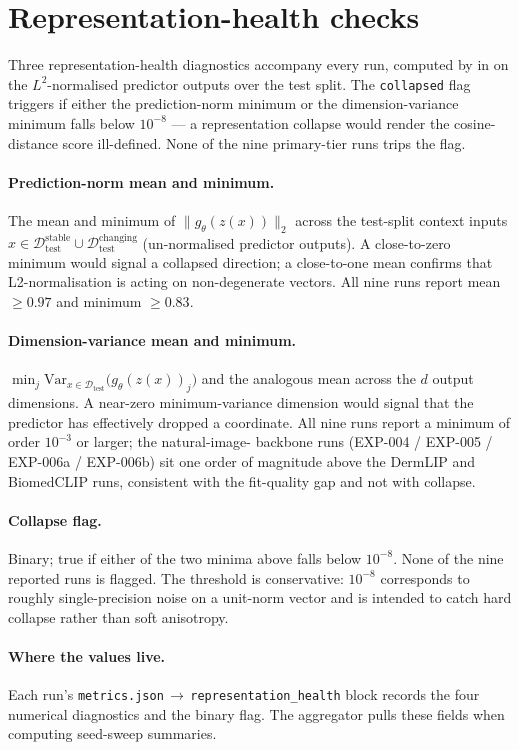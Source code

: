 \section{Representation-health checks}
\label{app:representation-health}

Three representation-health diagnostics accompany every run, computed
by  in  on the
$L^{2}$-normalised predictor outputs over the test split. The
\texttt{collapsed} flag triggers if either the prediction-norm minimum
or the dimension-variance minimum falls below $10^{-8}$ --- a
representation collapse would render the cosine-distance score
ill-defined. None of the nine primary-tier runs trips the flag.

\paragraph{Prediction-norm mean and minimum.} The mean and minimum of
$\lVert g_{\theta}(z(x)) \rVert_{2}$ across the test-split context
inputs $x \in \mathcal{D}_{\mathrm{test}}^{\mathrm{stable}} \cup
\mathcal{D}_{\mathrm{test}}^{\mathrm{changing}}$ (un-normalised
predictor outputs). A close-to-zero minimum would signal a collapsed
direction; a close-to-one mean confirms that L2-normalisation is
acting on non-degenerate vectors. All nine runs report mean
$\geq 0.97$ and minimum $\geq 0.83$.

\paragraph{Dimension-variance mean and minimum.}
$\min_{j} \mathrm{Var}_{x \in \mathcal{D}_{\mathrm{test}}}\!\bigl(
g_{\theta}(z(x))_{j}\bigr)$ and the analogous mean across the $d$
output dimensions. A near-zero minimum-variance dimension would signal
that the predictor has effectively dropped a coordinate. All nine
runs report a minimum of order $10^{-3}$ or larger; the natural-image-
backbone runs (EXP-004 / EXP-005 / EXP-006a / EXP-006b) sit one order
of magnitude above the DermLIP and BiomedCLIP runs, consistent with
the fit-quality gap and not with collapse.

\paragraph{Collapse flag.} Binary; $\mathrm{true}$ if either of the two
minima above falls below $10^{-8}$. None of the nine reported runs is
flagged. The threshold is conservative: $10^{-8}$ corresponds to roughly
single-precision noise on a unit-norm vector and is intended to catch
hard collapse rather than soft anisotropy.

\paragraph{Where the values live.} Each run's
\texttt{metrics.json}\,$\to$\,\texttt{representation\_health} block
records the four numerical diagnostics and the binary flag. The
aggregator  pulls these fields
when computing seed-sweep summaries.

